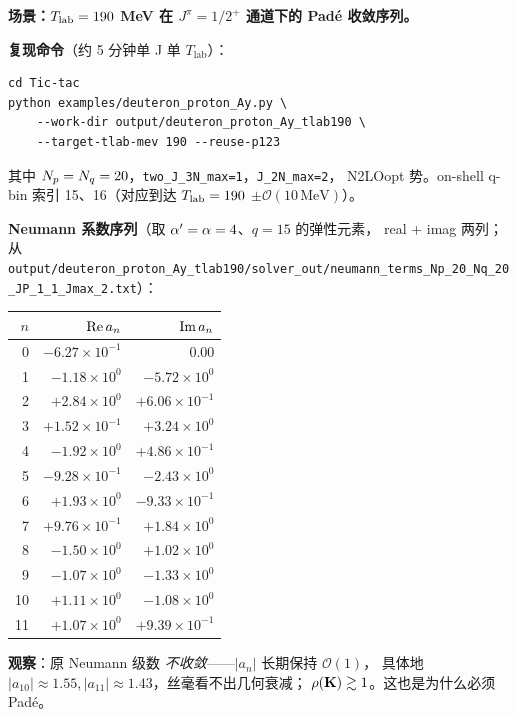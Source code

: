 \begin{numericalbox}
\textbf{场景：\({T_{\text{lab}}}=190\) MeV 在 \(J^\pi=1/2^+\) 通道下的 Padé 收敛序列。}

\textbf{复现命令}（约 5 分钟单 J 单 \(T_{\text{lab}}\)）：
\begin{verbatim}
cd Tic-tac
python examples/deuteron_proton_Ay.py \
    --work-dir output/deuteron_proton_Ay_tlab190 \
    --target-tlab-mev 190 --reuse-p123
\end{verbatim}
其中 \(N_p=N_q=20\)，\texttt{two\_J\_3N\_max=1}，\texttt{J\_2N\_max=2}，
N2LOopt 势。on-shell q-bin 索引 15、16（对应到达 \({T_{\text{lab}}}=190\)
\(\pm \mathcal{O}(10\,\text{MeV})\)）。

\textbf{Neumann 系数序列}（取 \(\alpha' = \alpha = 4\)、\(q=15\) 的弹性元素，
real + imag 两列；从 \texttt{output/deuteron\_proton\_Ay\_tlab190/solver\_out/neumann\_terms\_Np\_20\_Nq\_20\_JP\_1\_1\_Jmax\_2.txt}）：

\medskip
\begin{tabular}{rrr}
\toprule
\(n\) & \(\operatorname{Re} a_n\) & \(\operatorname{Im} a_n\) \\
\midrule
0  & \(-6.27\times 10^{-1}\) & \(0.00\) \\
1  & \(-1.18\times 10^{0}\)  & \(-5.72\times 10^{0}\) \\
2  & \(+2.84\times 10^{0}\)  & \(+6.06\times 10^{-1}\) \\
3  & \(+1.52\times 10^{-1}\) & \(+3.24\times 10^{0}\) \\
4  & \(-1.92\times 10^{0}\)  & \(+4.86\times 10^{-1}\) \\
5  & \(-9.28\times 10^{-1}\) & \(-2.43\times 10^{0}\) \\
6  & \(+1.93\times 10^{0}\)  & \(-9.33\times 10^{-1}\) \\
7  & \(+9.76\times 10^{-1}\) & \(+1.84\times 10^{0}\) \\
8  & \(-1.50\times 10^{0}\)  & \(+1.02\times 10^{0}\) \\
9  & \(-1.07\times 10^{0}\)  & \(-1.33\times 10^{0}\) \\
10 & \(+1.11\times 10^{0}\)  & \(-1.08\times 10^{0}\) \\
11 & \(+1.07\times 10^{0}\)  & \(+9.39\times 10^{-1}\) \\
\bottomrule
\end{tabular}

\textbf{观察}：原 Neumann 级数 \emph{不收敛}——\(|a_n|\) 长期保持 \(\mathcal{O}(1)\)，
具体地 \(|a_{10}| \approx 1.55, |a_{11}| \approx 1.43\)，丝毫看不出几何衰减；
\(\rho(\mathbf{K}) \gtrsim 1\)。这也是为什么必须 Padé。


\end{numericalbox}

